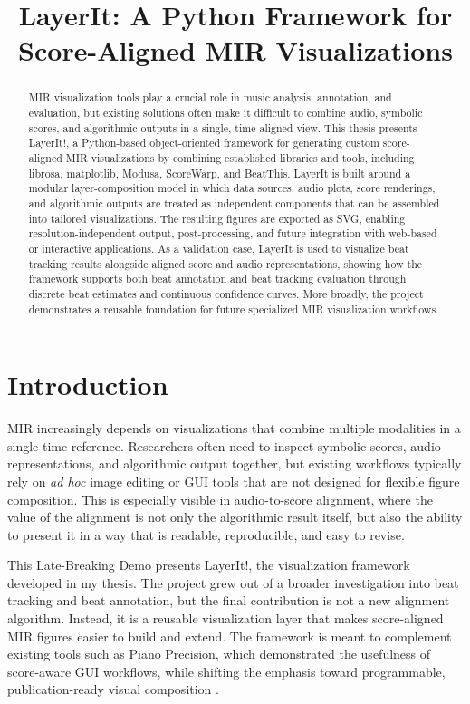 \documentclass{article}
\title{LayerIt: A Python Framework for Score-Aligned MIR Visualizations}
\begin{document}
%
\maketitle
%
\begin{abstract}
MIR visualization tools play a crucial role in music analysis, annotation, and evaluation, but existing solutions often make it difficult to combine audio, symbolic scores, and algorithmic outputs in a single, time-aligned view. This thesis presents LayerIt!, a Python-based object-oriented framework for generating custom score-aligned MIR visualizations by combining established libraries and tools, including librosa, matplotlib, Modusa, ScoreWarp, and BeatThis. LayerIt is built around a modular layer-composition model in which data sources, audio plots, score renderings, and algorithmic outputs are treated as independent components that can be assembled into tailored visualizations. The resulting figures are exported as SVG, enabling resolution-independent output, post-processing, and future integration with web-based or interactive applications. As a validation case, LayerIt is used to visualize beat tracking results alongside aligned score and audio representations, showing how the framework supports both beat annotation and beat tracking evaluation through discrete beat estimates and continuous confidence curves. More broadly, the project demonstrates a reusable foundation for future specialized MIR visualization workflows.
\end{abstract}
%
\section{Introduction}\label{sec:introduction}
MIR increasingly depends on visualizations that combine multiple modalities in a single time reference. Researchers often need to inspect symbolic scores, audio representations, and algorithmic output together, but existing workflows typically rely on \textit{ad hoc} image editing or GUI tools that are not designed for flexible figure composition. This is especially visible in audio-to-score alignment, where the value of the alignment is not only the algorithmic result itself, but also the ability to present it in a way that is readable, reproducible, and easy to revise.

This Late-Breaking Demo presents LayerIt!, the visualization framework developed in my thesis. The project grew out of a broader investigation into beat tracking and beat annotation, but the final contribution is not a new alignment algorithm. Instead, it is a reusable visualization layer that makes score-aligned MIR figures easier to build and extend. The framework is meant to complement existing tools such as Piano Precision, which demonstrated the usefulness of score-aware GUI workflows, while shifting the emphasis toward programmable, publication-ready visual composition \cite{jiangPIANOPRECISIONADVANCING2025}.
\end{document}
